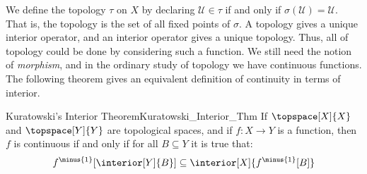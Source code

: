 \documentclass{article}                                                        %
\begin{document}
        \par\vspace{2.5ex}
        We define the topology $\tau$ on $X$ by declaring $\mathcal{U}\in\tau$
        if and only if $\sigma(\mathcal{U})=\mathcal{U}$. That is, the topology
        is the set of all fixed points of $\sigma$. A topology gives a unique
        interior operator, and an interior operator gives a unique topology.
        Thus, all of topology could be done by considering such a function. We
        still need the notion of \textit{morphism}, and in the ordinary study of
        topology we have continuous functions. The following theorem gives an
        equivalent definition of continuity in terms of interior.
        \begin{ftheorem}{Kuratowski's Interior Theorem}{Kuratowski_Interior_Thm}
            If $\topspace[X]{X}$ and $\topspace[Y]{Y}$ are topological spaces,
            and if $f:X\rightarrow{Y}$ is a function, then $f$ is continuous if
            and only if for all $B\subseteq{Y}$ it is true that:
            \begin{equation*}
                f^{\minus{1}}[\interior[Y]{B}]\subseteq
                    \interior[X]{f^{\minus{1}}[B]}
            \end{equation*}
        \end{ftheorem}
\end{document}
